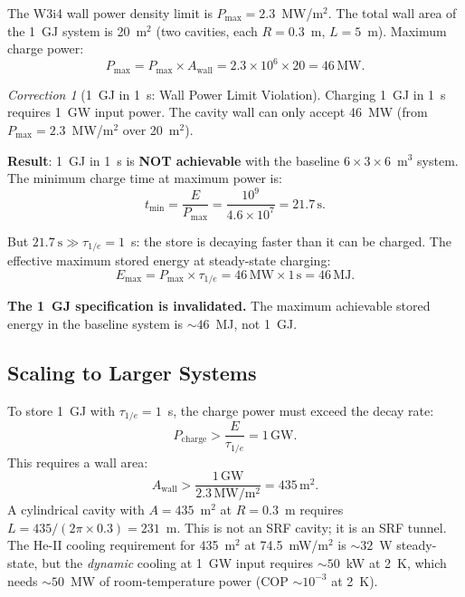 \documentclass[11pt]{article}
\theoremstyle{definition}
\theoremstyle{remark}
\newtheorem{correction}[theorem]{Correction}
\newcommand{\ee}[1]{\times10^{#1}}
\newcommand{\Pmax}{P_{\mathrm{max}}}
\begin{document}
The W3i4 wall power density limit is $\Pmax = 2.3$~MW/m$^2$. The total
wall area of the 1~GJ system is 20~m$^2$ (two cavities, each
$R = 0.3$~m, $L = 5$~m). Maximum charge power:
\begin{equation}
P_{\mathrm{max}} = \Pmax \times A_{\mathrm{wall}}
= 2.3\ee{6} \times 20 = 46\,\mathrm{MW}.
\label{eq:Pmax-system}
\end{equation}

\begin{correction}[1~GJ in 1~s: Wall Power Limit Violation]
\label{corr:1GJ-1s}
Charging 1~GJ in 1~s requires 1~GW input power. The cavity wall can
only accept 46~MW (from $\Pmax = 2.3$~MW/m$^2$ over 20~m$^2$).

\textbf{Result}: 1~GJ in 1~s is \textbf{NOT achievable} with the
baseline $6\times3\times6$~m$^3$ system. The minimum charge time at
maximum power is:
\begin{equation}
t_{\mathrm{min}} = \frac{E}{P_{\mathrm{max}}} = \frac{10^9}{4.6\ee{7}}
= 21.7\,\mathrm{s}.
\end{equation}

But $21.7~\mathrm{s} \gg \tau_{1/e} = 1$~s: the store is decaying
faster than it can be charged. The effective maximum stored energy at
steady-state charging:
\begin{equation}
E_{\mathrm{max}} = P_{\mathrm{max}} \times \tau_{1/e}
= 46\,\mathrm{MW} \times 1\,\mathrm{s} = 46\,\mathrm{MJ}.
\end{equation}

\textbf{The 1~GJ specification is invalidated.} The maximum achievable
stored energy in the baseline system is $\sim 46$~MJ, not 1~GJ.
\end{correction}

\subsection{Scaling to Larger Systems}

To store 1~GJ with $\tau_{1/e} = 1$~s, the charge power must exceed
the decay rate:
\begin{equation}
P_{\mathrm{charge}} > \frac{E}{\tau_{1/e}} = 1\,\mathrm{GW}.
\end{equation}
This requires a wall area:
\begin{equation}
A_{\mathrm{wall}} > \frac{1\,\mathrm{GW}}{2.3\,\mathrm{MW/m^2}}
= 435\,\mathrm{m}^2.
\end{equation}
A cylindrical cavity with $A = 435$~m$^2$ at $R = 0.3$~m requires
$L = 435/(2\pi \times 0.3) = 231$~m. This is not an SRF cavity; it is
an SRF tunnel. The He-II cooling requirement for 435~m$^2$ at
74.5~mW/m$^2$ is $\sim 32$~W steady-state, but the \emph{dynamic}
cooling at 1~GW input requires $\sim 50$~kW at 2~K, which needs
$\sim 50$~MW of room-temperature power (COP $\sim 10^{-3}$ at 2~K).
\end{document}
